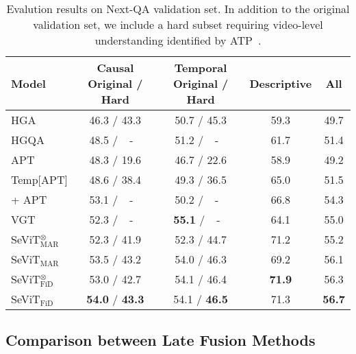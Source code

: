 \documentclass{article}
\newcommand{\frameworkname}{SeViT}
\begin{document}
\begin{table}[t!]
    \label{table:long-subsplit}
\end{table} \begin{table}[t!]
    \centering
    \small
    \caption{Evalution results on Next-QA validation set. In addition to the original validation set, we include a hard subset requiring video-level understanding identified by ATP~\cite{buch2022revisiting}.}
    \vskip 0.15in
\vskip 0.15in
   \begin{adjustbox}{width=0.48\textwidth} 
    \begin{tabular}{lcccc}
        \toprule
        Model & \makecell{Causal \\ \scriptsize{Original / Hard}} & \makecell{Temporal  \\ \scriptsize{Original / Hard}} & Descriptive & All \\
        \midrule
        HGA & 46.3 / 43.3 & 50.7 / 45.3 & 59.3 & 49.7 \\
        HGQA & 48.5 / $\;\;\,$-$\;\;\,$ & 51.2 / $\;\;\,$-$\;\;\,$ & 61.7 & 51.4 \\
        APT & 48.3 / 19.6 & 46.7 / 22.6 & 58.9 & 49.2 \\
        Temp[APT] & 48.6 / 38.4 & 49.3 / 36.5 & 65.0 & 51.5 \\
        \quad + APT & 53.1 / $\;\;\,$-$\;\;\,$ & 50.2 / $\;\;\,$-$\;\;\,$ & 66.8 & 54.3 \\
        VGT & 52.3 / $\;\;\,$-$\;\;\,$ & \textbf{55.1} / $\;\;\,$-$\;\;\,$ & 64.1 & 55.0 \\
        \midrule
        \frameworkname{}$_\text{MAR}^{\otimes}$ & 52.3 / 41.9 & 52.3 / 44.7 & 71.2 & 55.2 \\
        \frameworkname{}$_\text{MAR}$ & 53.5 / 43.2 & 54.0 / 46.3 & 69.2 & 56.1 \\
        \frameworkname{}$_\text{FiD}^{\otimes}$ & 53.0 / 42.7 & 54.1 / 46.4 & \textbf{71.9} & 56.3 \\
        \frameworkname{}$_\text{FiD}$ & \textbf{54.0} / \textbf{43.3} & 54.1 / \textbf{46.5} & 71.3 & \textbf{56.7} \\
        \bottomrule
    \end{tabular}
    \end{adjustbox}
\label{table:nextqa}
\end{table} 

\subsection{Comparison between Late Fusion Methods}
\end{document}
